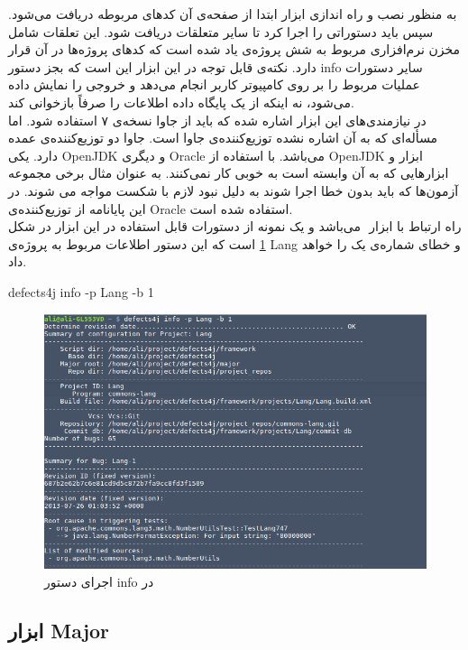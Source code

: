 به منظور نصب و راه اندازی ابزار   ابتدا از صفحه‌ی  آن  کدهای مربوطه دریافت می‌شود. سپس باید  دستوراتی را اجرا کرد تا سایر متعلقات دریافت شود. این تعلقات شامل مخزن نرم‌افزاری مربوط به شش پروژه‌ی یاد شده است که کدهای پروژه‌ها در آن قرار دارد. نکته‌ی قابل توجه در این ابزار این است  که بجز  دستور info سایر دستورات عملیات مربوط را بر روی کامپیوتر کاربر انجام می‌دهد و خروجی را نمایش  داده می‌شود، نه اینکه از یک پایگاه داده اطلاعات را صرفاً بازخوانی کند. \\
در نیازمندی‌های این ابزار اشاره شده که باید از جاوا نسخه‌ی ۷ استفاده شود. اما مسأله‌ای که به آن اشاره نشده توزیع‌کننده‌ی جاوا است. جاوا دو توزیع‌کننده‌ی عمده دارد. یکی OpenJDK و دیگری Oracle می‌باشد. با استفاده از OpenJDK ابزار  و ابزارهایی که به آن وابسته است به خوبی کار نمی‌کنند. به عنوان مثال برخی مجموعه آزمون‌ها که باید بدون خطا اجرا شوند به دلیل نبود   لازم با شکست مواجه می شوند. در این پایانامه از توزیع‌کننده‌ی Oracle استفاده شده است.\\ 
راه ارتباط با  ابزار  ‌ می‌باشد و  یک نمونه‌  از دستورات قابل استفاده در این ابزار  در شکل  \ref{fig:d4j-info-command} است که این دستور اطلاعات مربوط به پروژه‌ی Lang و خطای شماره‌ی یک را خواهد داد. 
\begin{latin}
	\flushleft
defects4j info -p Lang -b 1
\end{latin}

\begin{figure}[H]
	\centering
	\includegraphics[width=.8\textwidth]{img/case_study/d4j-info-commadn.png}
	\caption{اجرای دستور info در }
	\label{fig:d4j-info-command}
\end{figure}

\subsection{ابزار Major}
\label{sec:tools-major}

